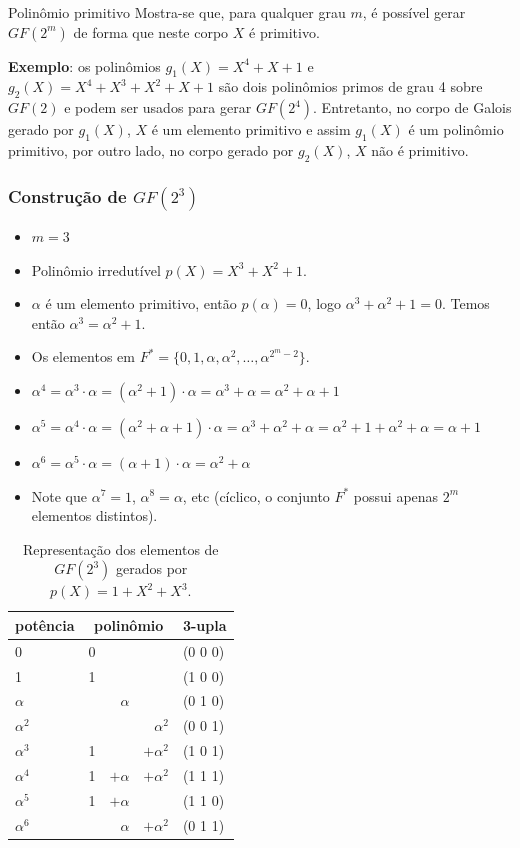 \begin{frame}[allowframebreaks]
\begin{block}{Polinômio primitivo}
    \vspace{2ex}
    Mostra-se que, para qualquer grau $m$, é possível gerar $GF(2^m)$ de forma que neste corpo $X$ é primitivo.
  \end{block}
  \textbf{Exemplo}: os polinômios $g_1(X) = X^4 + X + 1$ e $g_2(X) = X^4 + X^3 + X^2 + X + 1$ são dois polinômios primos de grau 4 sobre $GF(2)$
  e podem ser usados para gerar $GF(2^4)$. Entretanto, no corpo de Galois gerado por $g_1(X)$, $X$ é um elemento primitivo e assim $g_1(X)$ é um polinômio primitivo, 
  por outro lado, no corpo gerado por $g_2(X)$, $X$ não é primitivo.

\end{frame}


\begin{frame}[allowframebreaks]
  \frametitle{Construção de $GF(2^3)$}
  \begin{itemize}
  \item $m=3$
  \item Polinômio irredutível $p(X)=X^3+X^2+1$.
  \item $\alpha$ é um elemento primitivo, então $p(\alpha) = 0$, logo $\alpha^3 + \alpha^2 + 1 = 0$. Temos então $\alpha^3 = \alpha^2 + 1$.
  \item Os elementos em $F^\ast = \{0, 1, \alpha, \alpha^2, \ldots, \alpha^{2^m-2}\}$.
  \item $\alpha^4 = \alpha^3 \cdot \alpha = (\alpha^2 + 1) \cdot \alpha = \alpha^3 + \alpha = \alpha^2 + \alpha + 1$
  \item $\alpha^5 = \alpha^4 \cdot \alpha = (\alpha^2 + \alpha + 1) \cdot \alpha = \alpha^3 + \alpha^2 + \alpha = \alpha^2 + 1 + \alpha^2 + \alpha = \alpha + 1$
  \item $\alpha^6 = \alpha^5 \cdot \alpha = (\alpha + 1) \cdot \alpha = \alpha^2 + \alpha$
  \item Note que $\alpha^7 = 1$, $\alpha^8 = \alpha$, etc (cíclico, o conjunto $F^\ast$ possui apenas $2^{m}$ elementos distintos).
  \end{itemize}

  \framebreak
  \begin{table}
    \caption{Representação dos elementos de $GF(2^3)$ gerados por $p(X)=1+X^2+X^3$.}
    \begin{tabular}{lrrrl}
      potência & \multicolumn{3}{c}{polinômio} & 3-upla \\
      \hline
      0          & 0 & & & (0 0 0)\\ 
      1          & 1 & & & (1 0 0) \\
      $\alpha$   & & $\alpha$ & & (0 1 0) \\
      $\alpha^2$ & & & $\alpha^2$ & (0 0 1) \\
      $\alpha^3$ & 1 & & $+\alpha^2$ & (1 0 1) \\
      $\alpha^4$ & 1 & $+\alpha$ & $+\alpha^2$ & (1 1 1) \\
      $\alpha^5$ & 1 & $+\alpha$ & & (1 1 0) \\
      $\alpha^6$ & & $\alpha$ & $+\alpha^2$ & (0 1 1)
    \end{tabular}
  \end{table}
\end{frame}


